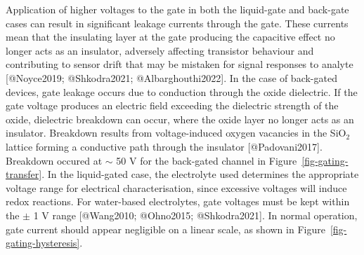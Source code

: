 \documentclass[
  letterpaper,
  DIV=11,
  numbers=noendperiod]{scrartcl}
\begin{document}
Application of higher voltages to the gate in both the liquid-gate and
back-gate cases can result in significant leakage currents through the
gate. These currents mean that the insulating layer at the gate
producing the capacitive effect no longer acts as an insulator,
adversely affecting transistor behaviour and contributing to sensor
drift that may be mistaken for signal responses to analyte
{[}@Noyce2019; @Shkodra2021; @Albarghouthi2022{]}. In the case of
back-gated devices, gate leakage occurs due to conduction through the
oxide dielectric. If the gate voltage produces an electric field
exceeding the dielectric strength of the oxide, dielectric breakdown can
occur, where the oxide layer no longer acts as an insulator. Breakdown
results from voltage-induced oxygen vacancies in the SiO\(_2\) lattice
forming a conductive path through the insulator {[}@Padovani2017{]}.
Breakdown occured at \(\sim\) 50 V for the back-gated channel in
Figure~\ref{fig-gating-transfer}. In the liquid-gated case, the
electrolyte used determines the appropriate voltage range for electrical
characterisation, since excessive voltages will induce redox reactions.
For water-based electrolytes, gate voltages must be kept within the
\(\pm\) 1 V range {[}@Wang2010; @Ohno2015; @Shkodra2021{]}. In normal
operation, gate current should appear negligible on a linear scale, as
shown in Figure~\ref{fig-gating-hysteresis}.
\end{document}
